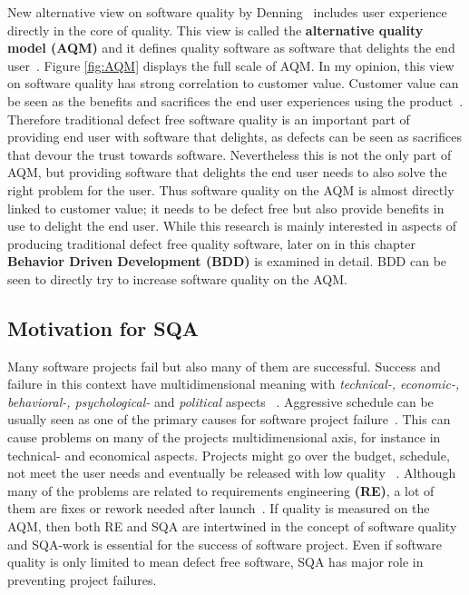     New alternative view on software quality by Denning~\cite{denning2016sq} includes user experience directly in the core of quality.
    This view is called the \textbf{alternative quality model (AQM)} and it defines quality software as software that delights
    the end user~\cite{denning2016sq}. Figure \ref{fig:AQM} displays the full scale of AQM.
    In my opinion, this view on software quality has strong correlation to customer value. Customer value can be seen as
    the benefits and sacrifices the end user experiences using the product~\cite{woodruff1997customer}. Therefore traditional
    defect free software quality is an important part of providing end user with software that delights, as defects
    can be seen as sacrifices that devour the trust towards software. Nevertheless this is not the only part of AQM,
    but providing software that delights the end user needs to also solve the right problem for the user.
    Thus software quality on the AQM is almost directly linked to customer value; it needs to be defect free but also
    provide benefits in use to delight the end user. While this research is mainly interested in aspects of producing traditional defect free quality software,
    later on in this chapter \textbf{Behavior Driven Development (BDD)} is examined in detail.
    BDD can be seen to directly try to increase software quality on the AQM.

    \subsection{Motivation for SQA}
    Many software projects fail but also many of them are successful. Success and failure in this context have multidimensional meaning with
    \textit{technical-, economic-, behavioral-, psychological-} and \textit{political} aspects ~\cite{mcleod2011factors}. Aggressive
    schedule can be usually seen as one of the primary causes for software project failure~\cite{cerpa2009did}. This can cause
    problems on many of the projects multidimensional axis, for instance in technical- and economical aspects. Projects might go
    over the budget, schedule, not meet the user needs and eventually be released with low quality ~\cite{cerpa2009did}.
    Although many of the problems are related to requirements engineering \textbf{(RE)}, a lot of them are fixes or rework needed after launch~\cite{lessons}.
    If quality is measured on the AQM, then both RE and SQA are intertwined in the concept of software quality and SQA-work
    is essential for the success of software project. Even if software quality is only limited to mean defect free software, SQA has
    major role in preventing project failures.

